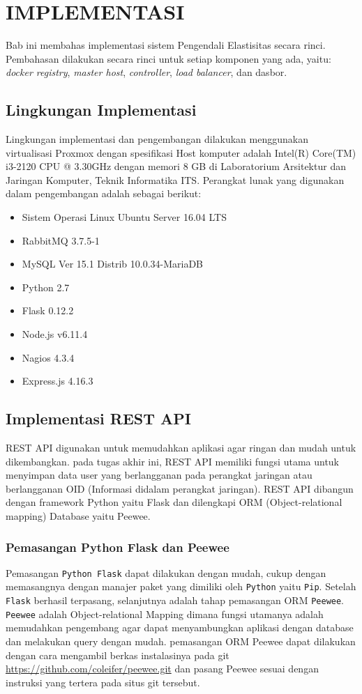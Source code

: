\chapter{IMPLEMENTASI}
	Bab ini membahas implementasi sistem Pengendali Elastisitas secara rinci. Pembahasan dilakukan secara rinci untuk setiap komponen yang ada, yaitu: \textit{docker registry}, \textit{master host}, \textit{controller}, \textit{load balancer}, dan dasbor.
    
    \section{Lingkungan Implementasi}
    	Lingkungan implementasi dan pengembangan dilakukan menggunakan virtualisasi Proxmox dengan spesifikasi Host komputer adalah Intel(R) Core(TM) i3-2120 CPU @ 3.30GHz dengan memori 8 GB di Laboratorium Arsitektur dan Jaringan Komputer, Teknik Informatika ITS. Perangkat lunak yang digunakan dalam pengembangan adalah sebagai berikut:
        \begin{itemize}
        \item Sistem Operasi Linux Ubuntu Server 16.04 LTS
        \item RabbitMQ 3.7.5-1
        \item MySQL Ver 15.1 Distrib 10.0.34-MariaDB
        \item Python 2.7
        \item Flask 0.12.2
        \item Node.js v6.11.4
        \item Nagios 4.3.4
        \item Express.js 4.16.3
        \end{itemize}
        
	\section{Implementasi REST API}
    	REST API digunakan untuk memudahkan aplikasi agar ringan dan mudah untuk dikembangkan. pada tugas akhir ini, REST API memiliki fungsi utama untuk menyimpan data user yang berlangganan pada perangkat jaringan atau berlangganan OID (Informasi didalam perangkat jaringan). REST API dibangun dengan framework Python yaitu Flask dan dilengkapi ORM (Object-relational mapping) Database yaitu Peewee.
        \subsection{Pemasangan Python Flask dan Peewee}
        	Pemasangan \texttt{Python Flask} dapat dilakukan dengan mudah, cukup dengan memasangnya dengan manajer paket yang dimiliki oleh \texttt{Python} yaitu \texttt{Pip}. Setelah \texttt{Flask} berhasil terpasang, selanjutnya adalah tahap pemasangan ORM \texttt{Peewee}. \texttt{Peewee} adalah Object-relational Mapping dimana fungsi utamanya adalah memudahkan pengembang agar dapat menyambungkan aplikasi dengan database dan melakukan query dengan mudah. pemasangan ORM Peewee dapat dilakukan dengan cara mengambil berkas instalasinya pada git \url{https://github.com/coleifer/peewee.git} dan pasang Peewee sesuai dengan instruksi yang tertera pada situs git tersebut.
        	
